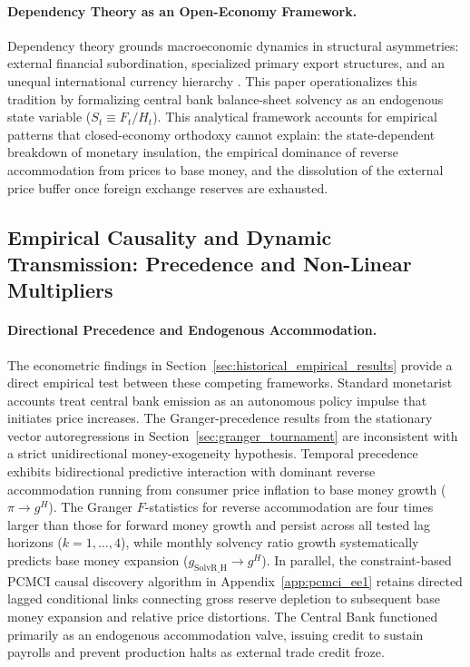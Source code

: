 \paragraph{Dependency Theory as an Open-Economy Framework.}
Dependency theory grounds macroeconomic dynamics in structural asymmetries: external financial subordination, specialized primary export structures, and an unequal international currency hierarchy \citep{Prebisch1950,Marini1973,DosSantos1970,Vasudevan2009,Basu2022}. This paper operationalizes this tradition by formalizing central bank balance-sheet solvency as an endogenous state variable ($S_t \equiv F_t / H_t$). This analytical framework accounts for empirical patterns that closed-economy orthodoxy cannot explain: the state-dependent breakdown of monetary insulation, the empirical dominance of reverse accommodation from prices to base money, and the dissolution of the external price buffer once foreign exchange reserves are exhausted.

\subsection{Empirical Causality and Dynamic Transmission: Precedence and Non-Linear Multipliers}
\label{sec:causality_transmission}

\paragraph{Directional Precedence and Endogenous Accommodation.}
The econometric findings in Section~\ref{sec:historical_empirical_results} provide a direct empirical test between these competing frameworks. Standard monetarist accounts treat central bank emission as an autonomous policy impulse that initiates price increases. The Granger-precedence results from the stationary vector autoregressions in Section~\ref{sec:granger_tournament} are inconsistent with a strict unidirectional money-exogeneity hypothesis. Temporal precedence exhibits bidirectional predictive interaction with dominant reverse accommodation running from consumer price inflation to base money growth ($\pi \to g^H$). The Granger $F$-statistics for reverse accommodation are four times larger than those for forward money growth and persist across all tested lag horizons ($k=1,\dots,4$), while monthly solvency ratio growth systematically predicts base money expansion ($g_{\text{SolvR\_H}} \to g^H$). In parallel, the constraint-based PCMCI causal discovery algorithm in Appendix~\ref{app:pcmci_ee1} retains directed lagged conditional links connecting gross reserve depletion to subsequent base money expansion and relative price distortions. The Central Bank functioned primarily as an endogenous accommodation valve, issuing credit to sustain payrolls and prevent production halts as external trade credit froze.

